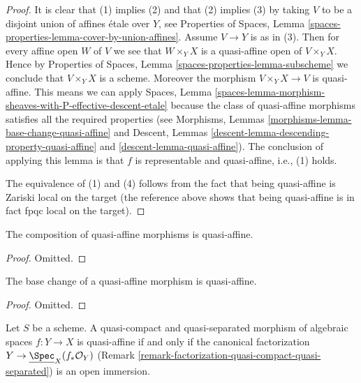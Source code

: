 \begin{proof}
It is clear that (1) implies (2) and that (2) implies (3) by taking
$V$ to be a disjoint union of affines \'etale over $Y$, see
Properties of Spaces,
Lemma \ref{spaces-properties-lemma-cover-by-union-affines}.
Assume $V \to Y$ is as in (3). Then for every affine open $W$ of $V$ we see
that $W \times_Y X$ is a quasi-affine open of $V \times_Y X$. Hence by
Properties of Spaces, Lemma \ref{spaces-properties-lemma-subscheme}
we conclude that $V \times_Y X$ is a scheme. Moreover the morphism
$V \times_Y X \to V$ is quasi-affine. This means we can apply
Spaces,
Lemma \ref{spaces-lemma-morphism-sheaves-with-P-effective-descent-etale}
because the class of quasi-affine morphisms satisfies all the required
properties (see
Morphisms, Lemmas \ref{morphisms-lemma-base-change-quasi-affine} and
Descent, Lemmas \ref{descent-lemma-descending-property-quasi-affine}
and \ref{descent-lemma-quasi-affine}). The conclusion of applying this lemma
is that $f$ is representable and quasi-affine, i.e., (1) holds.

\medskip\noindent
The equivalence of (1) and (4) follows from the fact that being
quasi-affine is Zariski local on the target (the reference above shows
that being quasi-affine is in fact fpqc local on the target).
\end{proof}

\begin{lemma}
\label{lemma-composition-quasi-affine}
The composition of quasi-affine morphisms is quasi-affine.
\end{lemma}

\begin{proof}
Omitted.
\end{proof}

\begin{lemma}
\label{lemma-base-change-quasi-affine}
The base change of a quasi-affine morphism is quasi-affine.
\end{lemma}

\begin{proof}
Omitted.
\end{proof}

\begin{lemma}
\label{lemma-characterize-quasi-affine}
Let $S$ be a scheme.
A quasi-compact and quasi-separated morphism of algebraic spaces
$f : Y \to X$ is quasi-affine if and only if the canonical factorization
$Y \to \underline{\Spec}_X(f_*\mathcal{O}_Y)$
(Remark \ref{remark-factorization-quasi-compact-quasi-separated})
is an open immersion.
\end{lemma}


